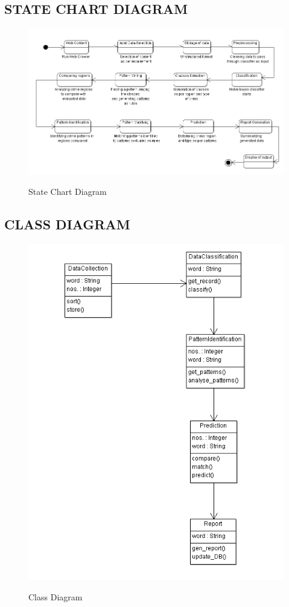 \documentclass[12pt]{extreport}
\begin{document}
    \subsection{STATE CHART DIAGRAM}
    
    \begin{figure}[H]
  \centering
  \includegraphics[scale=0.7]{STATECHARTCRIME.png}\\
  \caption{State Chart Diagram}
  
\end{figure}
\pagebreak
    \subsection{CLASS DIAGRAM}
    \begin{figure}[H]
    \centering
  \includegraphics[scale=0.75]{CLASS.png}\\
  \caption{Class Diagram}
  
\end{figure}
\end{document}
